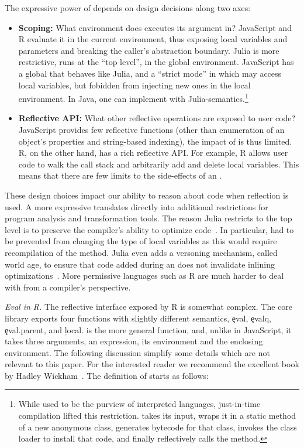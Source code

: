 \documentclass[USenglish,cleveref, autoref, thm-restate]{lipics-v2019}
\newcommand{\mypara}[1]{\medskip\noindent\emph{#1}\xspace}
\begin{document}
The expressive power of \eval depends on design decisions along two
axes:
\begin{itemize}
\item {\bf Scoping:} What environment does \eval executes its argument
  in? JavaScript and R evaluate it in the current environment, thus
  exposing local variables and parameters and breaking the caller's
  abstraction boundary. Julia is more restrictive, \eval runs at the
  ``top level'', in the global environment. JavaScript has a global
  \eval that behaves like Julia, and a ``strict mode'' in which \eval
  may access local variables, but fobidden from injecting new ones in
  the local environment. In Java, one can implement \eval with
  Julia-semantics.\footnote{While \eval used to be the purview of
  interpreted languages, just-in-time compilation lifted this
  restriction. \Eval takes its input, wraps it in a static method of a
  new anonymous class, generates bytecode for that class, invokes
  the class loader to install that code, and finally reflectively
  calls the method. }
\item {\bf Reflective API:} What other reflective operations are
  exposed to user code? JavaScript provides few reflective functions
  (other than enumeration of an object's properties and string-based
  indexing), the impact of \eval is thus limited. R, on the other
  hand, has a rich reflective API. For example, R allows user code to
  walk the call stack and arbitrarily add and delete local variables.
  This means that there are few limits to the side-effects of an
  \eval.
\end{itemize}

\noindent
These design choices impact our ability to reason about code when
reflection is used. A more expressive \eval translates directly into
additional restrictions for program analysis and transformation tools.
The reason Julia restricts \eval to the top level is to preserve the
compiler's ability to optimize code~\cite{oopsla18a}. In particular,
\eval had to be prevented from changing the type of local variables as
this would require recompilation of the method. Julia even adds a
versoning mechanism, called world age, to ensure that code added
during an \eval does not invalidate inlining
optimizations~\cite{oopsla20a}. More permissive languages such as R
are much harder to deal with from a compiler's perspective.

\mypara{Eval in R.} The reflective interface exposed by
R is somewhat complex. The core library exports four functions with
slightly different semantics, \c{eval}, \c{evalq}, \c{eval.parent},
and \c{local}. \Eval is the more general function, and, unlike in
JavaScript, it takes three arguments, an expression, its environment
and the enclosing environment. The following discussion simplify some
details which are not relevant to this paper. For the interested
reader we recommend the excellent book by Hadley
Wickham~\cite{hadley}. The definition of \eval starts as follows:
\end{document}
